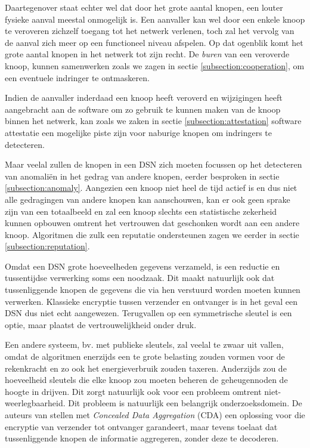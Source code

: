 Daartegenover staat echter wel dat door het grote aantal knopen, een louter
fysieke aanval meestal onmogelijk is. Een aanvaller kan wel door een enkele
knoop te veroveren zichzelf toegang tot het netwerk verlenen, toch zal het
vervolg van de aanval zich meer op een functioneel niveau afspelen. Op dat
ogenblik komt het grote aantal knopen in het netwerk tot zijn recht. De
\emph{buren} van een veroverde knoop, kunnen samenwerken zoals we zagen in
sectie \ref{subsection:cooperation}, om een eventuele indringer te ontmaskeren.

Indien de aanvaller inderdaad een knoop heeft veroverd en wijzigingen heeft
aangebracht aan de software om zo gebruik te kunnen maken van de knoop binnen
het netwerk, kan zoals we zaken in sectie \ref{subsection:attestation} software
attestatie een mogelijke piste zijn voor naburige knopen om indringers te
detecteren.

Maar veelal zullen de knopen in een DSN zich moeten focussen op het detecteren
van anomali\"en in het gedrag van andere knopen, eerder besproken in sectie
\ref{subsection:anomaly}. Aangezien een knoop niet heel de tijd actief is en
dus niet alle gedragingen van andere knopen kan aanschouwen, kan er ook geen
sprake zijn van een totaalbeeld en zal een knoop slechts een statistische
zekerheid kunnen opbouwen omtrent het vertrouwen dat geschonken wordt aan een
andere knoop. Algoritmen die zulk een reputatie ondersteunen zagen we eerder in
sectie \ref{subsection:reputation}.

Omdat een DSN grote hoeveelheden gegevens verzameld, is een reductie en
tussentijdse verwerking soms een noodzaak. Dit maakt natuurlijk ook dat
tussenliggende knopen de gegevens die via hen verstuurd worden moeten kunnen
verwerken. Klassieke encryptie tussen verzender en ontvanger is in het geval
een DSN dus niet echt aangewezen. Terugvallen op een symmetrische sleutel is
een optie, maar plaatst de vertrouwelijkheid onder druk.

Een andere systeem, bv. met publieke sleutels, zal veelal te zwaar uit vallen,
omdat de algoritmen enerzijds een te grote belasting zouden vormen voor de
rekenkracht en zo ook het energieverbruik zouden taxeren. Anderzijds zou de
hoeveelheid sleutels die elke knoop zou moeten beheren de geheugennoden de
hoogte in drijven. Dit zorgt natuurlijk ook voor een probleem omtrent
niet-weerlegbaarheid. Dit probleem is natuurlijk een belangrijk
onderzoeksdomein. De auteurs van \citep{girao2005cda} stellen met
\emph{Concealed Data Aggregation} (CDA) een oplossing voor die encryptie van
verzender tot ontvanger garandeert, maar tevens toelaat dat tussenliggende
knopen de informatie aggregeren, zonder deze te decoderen.

